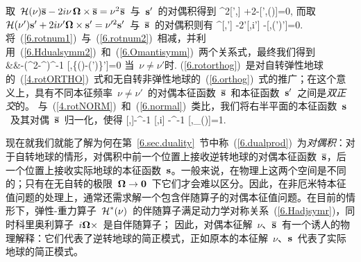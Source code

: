 取~$\mbox{$\cal H$}(\nu)\overline{\mbox{${\bf s}$}}-2i\nu_{\,}
\mbox{\boldmath $\bf \Omega$}\times\overline{\mbox{${\bf s}$}}=\nu^2\hspace{0.2 mm}\overline{\mbox{${\bf s}$}}$~与~$\mbox{${\bf s}$}'$~的对偶积得到
\eq
\label{6.rotnum1}
\nu^2[\hspace{0.3 mm}\bs',\overline{\bs}\hspace{0.3 mm}]
+2
-[\bs',\sH(\nu)\overline{\bs}\hspace{0.3 mm}]=0,
\en 
而取~$\mbox{$\cal H$}(\nu')\mbox{${\bf s}$}'+2i\nu^{\prime}_{\,}\mbox{\boldmath $\bf \Omega$}\times\mbox{${\bf s}$}'=\nu^{\prime 2}\mbox{${\bf s}$}'$~与~$\overline{\mbox{${\bf s}$}}$~的对偶积则有
\eq
\label{6.rotnum2}
\nu^{}[\hspace{0.3 mm}\overline{\bs},\bs']
-2\nu'[\hspace{0.3 mm}\overline{\bs},i\bOmega\times\bs']
-[\hspace{0.3 mm}\overline{\bs},\sH(\nu')\bs']=0.
\en
将~(\ref{6.rotnum1})~与~(\ref{6.rotnum2})~相减，并利用~(\ref{6.Hdualsymm2})~和~(\ref{6.Omantisymm})~两个关系式，最终我们得到
\eqa
\label{6.rotorthog}
 \nonumber \\
&&\mbox{}-(\nu^2-\nu^{})^{-1}
[\hspace{0.3 mm}\overline{\bs},\{\sH(\nu)-\sH(\nu')\}\bs']=0
\quad\mbox{当 $\nu\neq\nu'$时}.
\ena
(\ref{6.rotorthog})~是对自转弹性地球的~(\ref{4.rotORTHO})~式和无自转非弹性地球的~(\ref{6.orthog})~式的推广；在这个意义上，具有不同本征频率~$\nu\neq\nu'$~的对偶本征函数~$\overline{\mbox{${\bf s}$}}$~和本征函数~$\mbox{${\bf s}$}'$~之间是{\em 双正交\/}的。
%
与~(\ref{4.rotNORM})~和~(\ref{6.normal})~类比，我们将右半平面的本征函数~$\mbox{${\bf s}$}$~及其对偶~$\overline{\mbox{${\bf s}$}}$~归一化，使得
\eq
\label{6.rotnormal}
[\hspace{0.3 mm}\overline{\bs},\bs]-\nu^{-1}
[\hspace{0.3 mm}\overline{\bs},i\bOmega\times\bs]
-\half\nu^{-1}
[\hspace{0.3 mm}\overline{\bs},\p_{\nu}\sH(\nu)\bs]=1.
\en

现在就我们就能了解为何在第~\ref{6.sec.duality}~节中称~(\ref{6.dualprod})~为{\em 对偶积\/}：对于自转地球的情形，对偶积中前一个位置上接收逆转地球的对偶本征函数~$\overline{\mbox{${\bf s}$}}$，后一个位置上接收实际地球的本征函数~$\mbox{${\bf s}$}$。一般来说，在物理上这两个空间是不同的；只有在无自转的极限~$\mbox{\boldmath $\bf \Omega$}\rightarrow\mbox{${\bf 0}$}$~下它们才会难以区分。因此，在非厄米特本征值问题的处理上，通常还需求解一个包含伴随算子的对偶本征值问题。在目前的情形下，弹性-重力算子~$\mbox{$\cal H$}^*(\nu)$~的伴随算子满足动力学对称关系~(\ref{6.Hadjsymr})，同时科里奥利算子~$i\mbox{\boldmath $\bf \Omega$}\times$~是自伴随算子；
%
%
因此，对偶本征解~$\nu$、$\overline{\mbox{${\bf s}$}}$~有一个诱人的物理解释：它们代表了逆转地球的简正模式，正如原本的本征解~$\nu$、$\mbox{${\bf s}$}$~代表了实际地球的简正模式。
%
%

